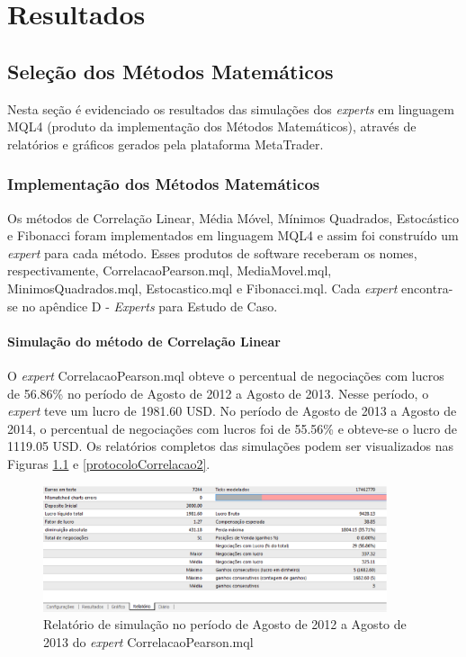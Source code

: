\chapter{Resultados}


\section{Seleção dos Métodos Matemáticos}

Nesta seção é evidenciado os resultados  das simulações dos \textit{experts} em linguagem MQL4 (produto da implementação dos Métodos Matemáticos), através de relatórios e gráficos gerados pela plataforma MetaTrader.

\subsection{Implementação dos Métodos Matemáticos}

Os métodos de Correlação Linear, Média Móvel, Mínimos Quadrados, Estocástico e Fibonacci foram implementados em linguagem MQL4 e assim foi construído um \textit{expert} para cada método. Esses produtos de software receberam os nomes, respectivamente, CorrelacaoPearson.mql, MediaMovel.mql, MinimosQuadrados.mql, Estocastico.mql e Fibonacci.mql. Cada \textit{expert} encontra-se no apêndice D - \textit{Experts} para Estudo de Caso.

\subsubsection{Simulação do método de Correlação Linear}

O \textit{expert} CorrelacaoPearson.mql obteve o percentual de negociações com lucros de 56.86\% no período de Agosto de 2012 a Agosto de 2013. Nesse período, o \textit{expert} teve um lucro de 1981.60 USD. No período de Agosto de 2013 a Agosto de 2014, o percentual de negociações com lucros foi de 55.56\%  e obteve-se o lucro de 1119.05 USD. 
Os relatórios completos das simulações podem ser visualizados nas Figuras \ref{protocoloCorrelacao} e \ref{protocoloCorrelacao2}.

\begin{figure}[H]
\centering
\includegraphics[width=0.9\textwidth]{figuras/protocoloCorrelacao}
\caption{Relatório de simulação no período de Agosto de 2012 a Agosto de 2013 do \textit{expert} CorrelacaoPearson.mql}
\label{protocoloCorrelacao}
\end{figure}

